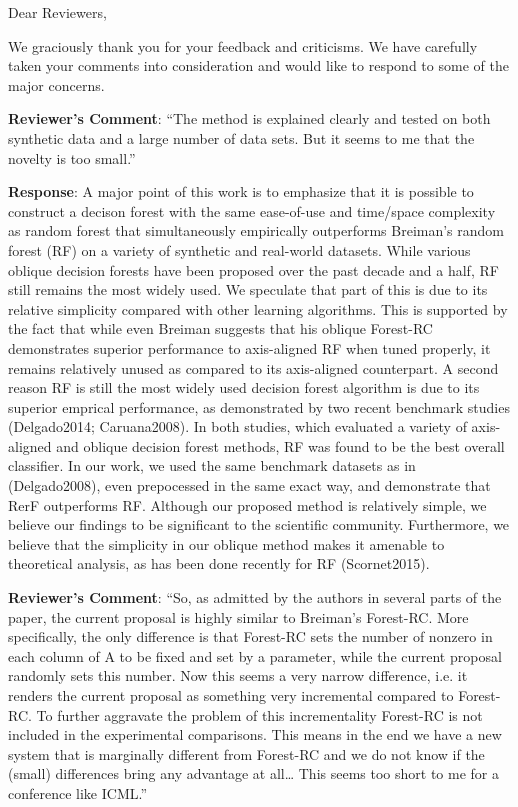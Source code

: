 \documentclass{article}
\begin{document}
Dear Reviewers,

We graciously thank you for your feedback and criticisms. We have carefully taken your comments into consideration and would like to respond to some of the major concerns.

\textbf{Reviewer's Comment}: ``The method is explained clearly and tested on both synthetic data and a large number of data sets. But it seems to me that the novelty is too small.''

\textbf{Response}: A major point of this work is to emphasize that it is possible to construct a decison forest with the same ease-of-use and time/space complexity as random forest that simultaneously empirically outperforms Breiman's random forest (RF) on a variety of synthetic and real-world datasets. While various oblique decision forests have been proposed over the past decade and a half, RF still remains the most widely used. We speculate that part of this is due to its relative simplicity compared with other learning algorithms. This is supported by the fact that while even Breiman suggests that his oblique Forest-RC demonstrates superior performance to axis-aligned RF when tuned properly, it remains relatively unused as compared to its axis-aligned counterpart. A second reason RF is still the most widely used decision forest algorithm is due to its superior emprical performance, as demonstrated by two recent benchmark studies (Delgado2014; Caruana2008). In both studies, which evaluated a variety of axis-aligned and oblique decision forest methods, RF was found to be the best overall classifier. In our work, we used the same benchmark datasets as in (Delgado2008), even prepocessed in the same exact way, and demonstrate that RerF outperforms RF. Although our proposed method is relatively simple, we believe our findings to be significant to the scientific community. Furthermore, we believe that the simplicity in our oblique method makes it amenable to theoretical analysis, as has been done recently for RF (Scornet2015).

\textbf{Reviewer's Comment}: ``So, as admitted by the authors in several parts of the paper, the current proposal is highly similar to Breiman’s Forest-RC. More specifically, the only difference is that Forest-RC sets the number of nonzero in each column of A to be fixed and set by a parameter, while the current proposal randomly sets this number. Now this seems a very narrow difference, i.e. it renders the current proposal as something very incremental compared to Forest-RC. To further aggravate the problem of this incrementality Forest-RC is not included in the experimental comparisons. This means in the end we have a new system that is marginally different from Forest-RC and we do not know if the (small) differences bring any advantage at all… This seems too short to me for a conference like ICML.''
\end{document}
